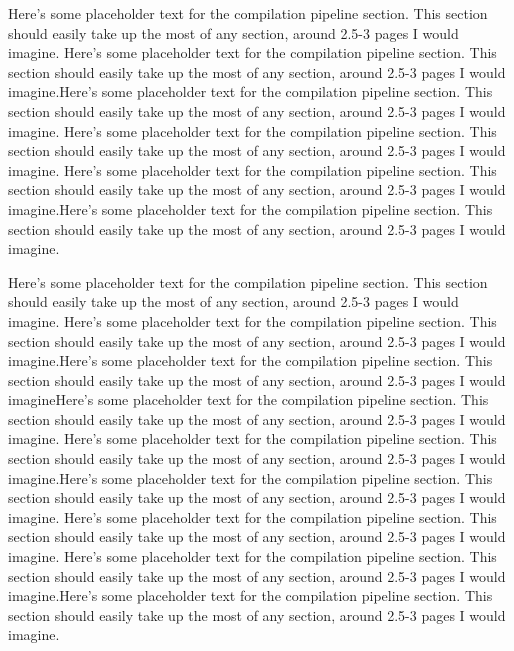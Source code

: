 \documentclass[preprint]{sigplanconf}
\begin{document}
Here's some placeholder text for the compilation pipeline section.  This
section should easily take up the most of any section, around 2.5-3 pages I
would imagine.
Here's some placeholder text for the compilation pipeline section.  This
section should easily take up the most of any section, around 2.5-3 pages I
would imagine.Here's some placeholder text for the compilation pipeline section.
 This
section should easily take up the most of any section, around 2.5-3 pages I
would imagine.
Here's some placeholder text for the compilation pipeline section.  This
section should easily take up the most of any section, around 2.5-3 pages I
would imagine.
Here's some placeholder text for the compilation pipeline section.  This
section should easily take up the most of any section, around 2.5-3 pages I
would imagine.Here's some placeholder text for the compilation pipeline section.
 This
section should easily take up the most of any section, around 2.5-3 pages I
would imagine.

Here's some placeholder text for the compilation pipeline section.  This
section should easily take up the most of any section, around 2.5-3 pages I
would imagine.
Here's some placeholder text for the compilation pipeline section.  This
section should easily take up the most of any section, around 2.5-3 pages I
would imagine.Here's some placeholder text for the compilation pipeline section.
 This
section should easily take up the most of any section, around 2.5-3 pages I
would imagineHere's some placeholder text for the compilation pipeline section.
This
section should easily take up the most of any section, around 2.5-3 pages I
would imagine.
Here's some placeholder text for the compilation pipeline section.  This
section should easily take up the most of any section, around 2.5-3 pages I
would imagine.Here's some placeholder text for the compilation pipeline section.
 This
section should easily take up the most of any section, around 2.5-3 pages I
would imagine.
Here's some placeholder text for the compilation pipeline section.  This
section should easily take up the most of any section, around 2.5-3 pages I
would imagine.
Here's some placeholder text for the compilation pipeline section.  This
section should easily take up the most of any section, around 2.5-3 pages I
would imagine.Here's some placeholder text for the compilation pipeline section.
 This
section should easily take up the most of any section, around 2.5-3 pages I
would imagine.
\end{document}
